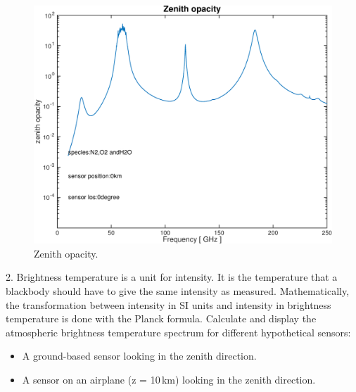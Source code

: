 \documentclass[paper=a4, fontsize=11pt]{scrartcl} %
\begin{document}
\begin{figure}[ht]
  \centering
  \includegraphics[width=\textwidth]{plots/opacity_N2+O2+H2O_0km_0deg.pdf}
  \caption{Zenith opacity.}
\end{figure}

\clearpage

2. Brightness temperature is a unit for intensity. It is the temperature that a
blackbody should have to give the same intensity as measured. Mathematically,
the transformation between intensity in SI units and intensity in brightness
temperature is done with the Planck formula. Calculate and display the
atmospheric brightness temperature spectrum for different hypothetical sensors:

\begin{itemize}
  \item A ground-based sensor looking in the zenith direction.
  \item A sensor on an airplane (z = 10\,km) looking in the zenith direction.
\end{itemize}
\end{document}
